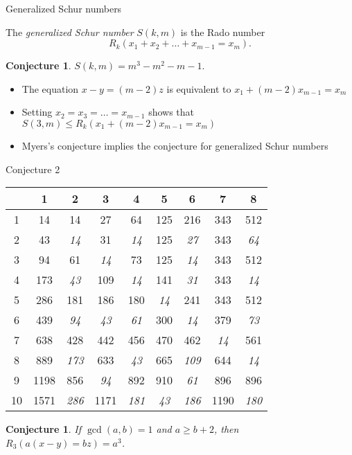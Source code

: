 \documentclass{beamer}
\newtheorem{conjecture}[theorem]{Conjecture}
\begin{document}
\begin{frame}{Generalized Schur numbers}
\begin{definition}
	The \emph{generalized Schur number} $S(k,m)$ is the Rado number $$R_k(x_1+x_2+\dots+x_{m-1} = x_m).$$ 
	\end{definition}
\begin{conjecture}
	$S(k,m) = m^3-m^2-m-1.$
\end{conjecture}
\pause 
\begin{itemize}
\item The equation $x-y = (m-2)z$ is equivalent to $x_1 + (m-2)x_{m-1} = x_m$
\pause \item Setting $x_2 = x_3 = \dots = x_{m-1}$ shows that $S(3,m) \le R_k(x_1 + (m-2)x_{m-1} = x_m)$
\pause \item Myers's conjecture implies the conjecture for generalized Schur numbers 
\end{itemize}

\end{frame}
\begin{frame}{Conjecture 2}
\begin{center}
\begin{tabular}{c|cccccccc}
	\diagbox{$b$}{$a$} & 1 & 2 & 3 & 4 &5&6&7&8\\
	\hline
	1 & 14 & 14 & {\color{red}27} & {\color{red}64} &{\color{red}125} &{\color{red}216} & {\color{red}343} & {\color{red}512}\\
	2 & 43 & \textit{14} & 31 & \textit{14} &{\color{red}125} &\textit{27} &{\color{red}343}&\textit{64} \\
	3 & 94 & 61 & \textit{14} & 73 &{\color{red}125}&\textit{14}&{\color{red}343}&{\color{red}512}\\
	4 & 173 & \textit{43} & 109 & \textit{14} &141&\textit{31}&{\color{red}343}&\textit{14} \\
	5 & 286 & 181 & 186 & 180 &\textit{14} &241 & {\color{red}343} & {\color{red}512}\\
	6 & 439 & \textit{94} & \textit{43}  & \textit{61} &300&\textit{14}& 379 &\textit{73}\\
	7 & 638 & 428 & 442 & 456 &470&462 &\textit{14}&561\\
	8 & 889 & \textit{173} & 633 & \textit{43}&665&\textit{109}& 644 &\textit{14}\\
	9 & 1198 & 856 & \textit{94}& 892 & 910 & \textit{61} & 896 & 896\\
	10 & 1571 & \textit{286} & 1171 & \textit{181} &\textit{43}& \textit{186} & 1190 &\textit{180}
\end{tabular} 
\end{center}

\begin{conjecture}
	If $\gcd(a,b) = 1$ and $a\ge b+2$, then $R_3(a(x-y)=bz) = a^3$. 
\end{conjecture}
\end{frame}
\end{document}
